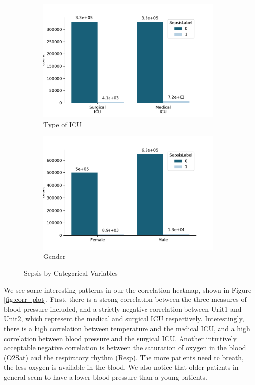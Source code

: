 \documentclass[10pt,letterpaper]{article}
\begin{document}
\begin{figure}[hbtp!]
\centering
\begin{subfigure}[b]{0.45\textwidth}
    \centering
    \includegraphics[scale = 0.6]{label_ICU.pdf}
    \caption{Type of ICU}
    \label{fig:label_ICU}
\end{subfigure}
\begin{subfigure}[b]{0.45\textwidth}
    \centering
    \includegraphics[scale = 0.6]{label_per_sex.pdf}
    \caption{Gender}
    \label{fig:label_per_sex}
\end{subfigure}
\caption{Sepsis by Categorical Variables}
\end{figure}

\par We see some interesting patterns in our the correlation heatmap, shown in Figure \ref{fig:corr_plot}. First, there is a strong correlation between the three measures of blood pressure included, and a strictly negative correlation between Unit1 and Unit2, which represent the medical and surgical ICU respectively. Interestingly, there is a high correlation between temperature and the medical ICU, and a high correlation between blood pressure and the surgical ICU. Another intuitively acceptable negative correlation is between the saturation of oxygen in the blood (O2Sat) and the respiratory rhythm (Resp). The more patients need to breath, the less oxygen is available in the blood. We also notice that older patients in general seem to have a lower blood pressure than a young patients. 
\end{document}
